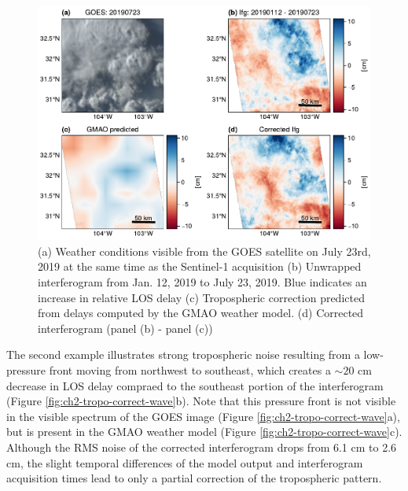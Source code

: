 \begin{figure}[!ht]
	\centering
	\includegraphics[width=1.0\textwidth]{figures/chapter2-sar/figure_tropo_correct_storm.pdf}
	\caption[West Texas tropospheric correction for thunderstorm]{
		(a) Weather conditions visible from the GOES satellite on July 23rd, 2019 at the same time as the Sentinel-1 acquisition
		(b) Unwrapped interferogram from Jan. 12, 2019 to July 23, 2019. Blue indicates an increase in relative LOS delay
		(c) Tropospheric correction predicted from delays computed by the GMAO weather model.
		(d) Corrected interferogram (panel (b) - panel (c))
	}
	\label{fig:ch2-tropo-correct-storm}
\end{figure}

The second example illustrates strong tropospheric noise resulting from a low-pressure front moving from northwest to southeast, which creates a $\sim 20$ cm decrease in LOS delay compraed to the southeast portion of the interferogram (Figure \ref{fig:ch2-tropo-correct-wave}b). Note that this pressure front is not visible in the visible spectrum of the GOES image (Figure \ref{fig:ch2-tropo-correct-wave}a), but is present in the GMAO weather model (Figure \ref{fig:ch2-tropo-correct-wave}c). Although the RMS noise of the corrected interferogram drops from 6.1 cm to 2.6 cm, the slight temporal differences of the model output and interferogram acquisition times lead to only a partial correction of the tropospheric pattern.

